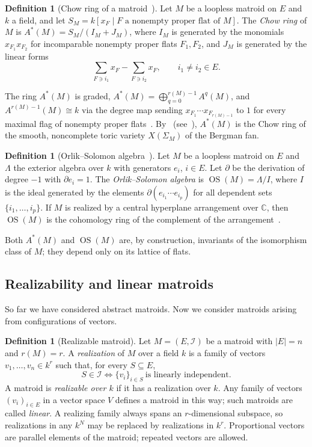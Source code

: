 \documentclass[11pt,a4paper]{article}
\numberwithin{equation}{section}
\theoremstyle{plain}
\theoremstyle{definition}
\newtheorem{definition}[theorem]{Definition}
\theoremstyle{remark}
\newcommand{\C}{\mathbb{C}}
\newcommand{\cI}{\mathcal{I}}
\DeclareMathOperator{\OS}{OS}
\begin{document}
\begin{definition}[Chow ring of a matroid~{\cite[Def.~1.3]{AHK18}}]\label{def:chow}
Let $M$ be a loopless matroid on $E$ and $k$ a field, and let $S_M=k[x_F\mid F\text{ a nonempty proper flat of }M]$. The \emph{Chow ring} of $M$ is $A^*(M)=S_M/(I_M+J_M)$, where $I_M$ is generated by the monomials $x_{F_1}x_{F_2}$ for incomparable nonempty proper flats $F_1,F_2$, and $J_M$ is generated by the linear forms
\[
\sum_{F\ni i_1}x_F-\sum_{F\ni i_2}x_F,\qquad i_1\neq i_2\in E.
\]
\end{definition}

The ring $A^*(M)$ is graded, $A^*(M)=\bigoplus_{q=0}^{r(M)-1}A^q(M)$, and $A^{r(M)-1}(M)\cong k$ via the degree map sending $x_{F_1}\cdots x_{F_{r(M)-1}}$ to $1$ for every maximal flag of nonempty proper flats~\cite{AHK18}. By~\cite{FY04} (see~\cite[§1]{AHK18}), $A^*(M)$ is the Chow ring of the smooth, noncomplete toric variety $X(\Sigma_M)$ of the Bergman fan.

\begin{definition}[Orlik--Solomon algebra~\cite{OT92}]
Let $M$ be a loopless matroid on $E$ and $\Lambda$ the exterior algebra over $k$ with generators $e_i$, $i\in E$. Let $\partial$ be the derivation of degree $-1$ with $\partial e_i=1$. The \emph{Orlik--Solomon algebra} is $\OS(M)=\Lambda/I$, where $I$ is the ideal generated by the elements $\partial(e_{i_1}\cdots e_{i_p})$ for all dependent sets $\{i_1,\dots,i_p\}$. If $M$ is realized by a central hyperplane arrangement over $\C$, then $\OS(M)$ is the cohomology ring of the complement of the arrangement~\cite{OT92}.
\end{definition}

Both $A^*(M)$ and $\OS(M)$ are, by construction, invariants of the isomorphism class of $M$; they depend only on its lattice of flats.

\subsection{Realizability and linear matroids}

So far we have considered abstract matroids. Now we consider matroids arising from configurations of vectors.

\begin{definition}[Realizable matroid]\label{def:realization}
Let $M=(E,\cI)$ be a matroid with $|E|=n$ and $r(M)=r$. A \emph{realization} of $M$ over a field $k$ is a family of vectors $v_1,\dots,v_n\in k^r$ such that, for every $S\subseteq E$,
\[
S\in\cI\iff\{v_i\}_{i\in S}\ \text{is linearly independent}.
\]
A matroid is \emph{realizable over $k$} if it has a realization over $k$. Any family of vectors $(v_i)_{i\in E}$ in a vector space $V$ defines a matroid in this way; such matroids are called \emph{linear}. A realizing family always spans an $r$-dimensional subspace, so realizations in any $k^N$ may be replaced by realizations in $k^r$. Proportional vectors are parallel elements of the matroid; repeated vectors are allowed.
\end{definition}
\end{document}
